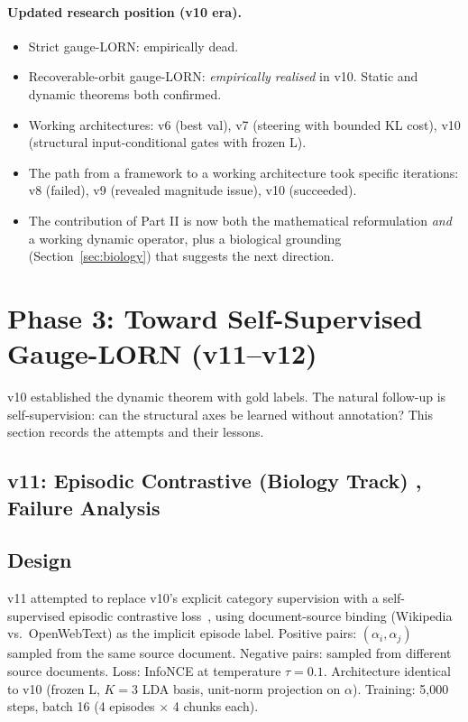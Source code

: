 \documentclass[11pt, a4paper]{article}
\theoremstyle{plain}
\theoremstyle{definition}
\theoremstyle{remark}
\begin{document}
\paragraph{Updated research position (v10 era).}
\begin{itemize}[nosep]
\item Strict gauge-LORN: empirically dead.
\item Recoverable-orbit gauge-LORN: \emph{empirically realised} in v10. Static and dynamic theorems both confirmed.
\item Working architectures: v6 (best val), v7 (steering with bounded KL cost), v10 (structural input-conditional gates with frozen L).
\item The path from a framework to a working architecture took specific iterations: v8 (failed), v9 (revealed magnitude issue), v10 (succeeded).
\item The contribution of Part II is now both the mathematical reformulation \emph{and} a working dynamic operator, plus a biological grounding (Section~\ref{sec:biology}) that suggests the next direction.
\end{itemize}


\section{Phase 3: Toward Self-Supervised Gauge-LORN (v11--v12)}
\label{sec:phase3}

v10 established the dynamic theorem with gold labels.
The natural follow-up is self-supervision: can the structural axes be learned
without annotation?
This section records the attempts and their lessons.

\subsection{v11: Episodic Contrastive (Biology Track) ,  Failure Analysis}
\label{sec:v11-results}

\subsection{Design}

v11 attempted to replace v10's explicit category supervision with a self-supervised
episodic contrastive loss~\cite{chen2020simple}, using document-source binding (Wikipedia
vs.\ OpenWebText) as the implicit episode label.
Positive pairs: $(\alpha_i, \alpha_j)$ sampled from the same source document.
Negative pairs: sampled from different source documents.
Loss: InfoNCE at temperature $\tau = 0.1$.
Architecture identical to v10 (frozen L, $K=3$ LDA basis, unit-norm projection on $\alpha$).
Training: 5,000 steps, batch 16 (4 episodes $\times$ 4 chunks each).
\end{document}
